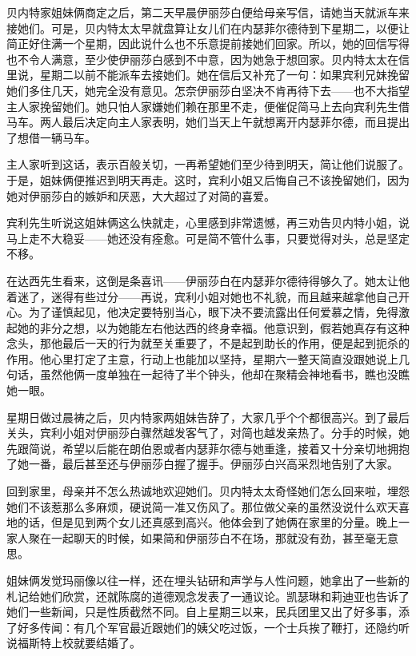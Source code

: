 \par 贝内特家姐妹俩商定之后，第二天早晨伊丽莎白便给母亲写信，请她当天就派车来接她们。可是，贝内特太太早就盘算让女儿们在内瑟菲尔德待到下星期二，以便让简正好住满一个星期，因此说什么也不乐意提前接她们回家。所以，她的回信写得也不令人满意，至少使伊丽莎白感到不中意，因为她急于想回家。贝内特太太在信里说，星期二以前不能派车去接她们。她在信后又补充了一句：如果宾利兄妹挽留她们多住几天，她完全没有意见。怎奈伊丽莎白坚决不肯再待下去——也不大指望主人家挽留她们。她只怕人家嫌她们赖在那里不走，便催促简马上去向宾利先生借马车。两人最后决定向主人家表明，她们当天上午就想离开内瑟菲尔德，而且提出了想借一辆马车。
\par 主人家听到这话，表示百般关切，一再希望她们至少待到明天，简让他们说服了。于是，姐妹俩便推迟到明天再走。这时，宾利小姐又后悔自己不该挽留她们，因为她对伊丽莎白的嫉妒和厌恶，大大超过了对简的喜爱。
\par 宾利先生听说这姐妹俩这么快就走，心里感到非常遗憾，再三劝告贝内特小姐，说马上走不大稳妥——她还没有痊愈。可是简不管什么事，只要觉得对头，总是坚定不移。
\par 在达西先生看来，这倒是条喜讯——伊丽莎白在内瑟菲尔德待得够久了。她太让他着迷了，迷得有些过分——再说，宾利小姐对她也不礼貌，而且越来越拿他自己开心。为了谨慎起见，他决定要特别当心，眼下决不要流露出任何爱慕之情，免得激起她的非分之想，以为她能左右他达西的终身幸福。他意识到，假若她真存有这种念头，那他最后一天的行为就至关重要了，不是起到助长的作用，便是起到扼杀的作用。他心里打定了主意，行动上也能加以坚持，星期六一整天简直没跟她说上几句话，虽然他俩一度单独在一起待了半个钟头，他却在聚精会神地看书，瞧也没瞧她一眼。
\par 星期日做过晨祷之后，贝内特家两姐妹告辞了，大家几乎个个都很高兴。到了最后关头，宾利小姐对伊丽莎白骤然越发客气了，对简也越发亲热了。分手的时候，她先跟简说，希望以后能在朗伯恩或者内瑟菲尔德与她重逢，接着又十分亲切地拥抱了她一番，最后甚至还与伊丽莎白握了握手。伊丽莎白兴高采烈地告别了大家。
\par 回到家里，母亲并不怎么热诚地欢迎她们。贝内特太太奇怪她们怎么回来啦，埋怨她们不该惹那么多麻烦，硬说简一准又伤风了。那位做父亲的虽然没说什么欢天喜地的话，但是见到两个女儿还真感到高兴。他体会到了她俩在家里的分量。晚上一家人聚在一起聊天的时候，如果简和伊丽莎白不在场，那就没有劲，甚至毫无意思。
\par 姐妹俩发觉玛丽像以往一样，还在埋头钻研和声学与人性问题，她拿出了一些新的札记给她们欣赏，还就陈腐的道德观念发表了一通议论。凯瑟琳和莉迪亚也告诉了她们一些新闻，只是性质截然不同。自上星期三以来，民兵团里又出了好多事，添了好多传闻：有几个军官最近跟她们的姨父吃过饭，一个士兵挨了鞭打，还隐约听说福斯特上校就要结婚了。


